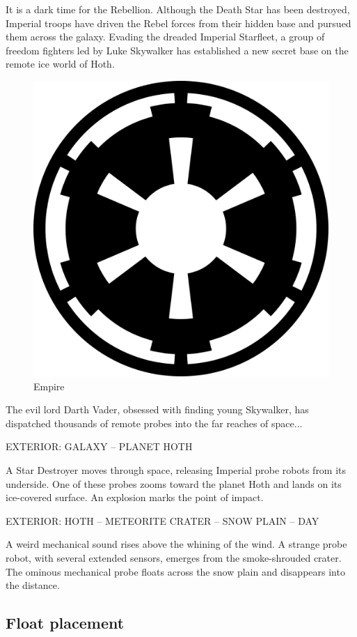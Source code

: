 \documentclass[a4paper]{article}
\begin{document}
It is a dark time for the Rebellion. Although the Death Star has
been destroyed, Imperial troops have driven the Rebel forces from
their hidden base and pursued them across the galaxy.
Evading the dreaded Imperial Starfleet, a group of freedom fighters
led by Luke Skywalker has established a new secret base on the remote
ice world of Hoth.
\begin{figure}
\centering
\includegraphics[width=0.5\linewidth]{empire} 
\caption{Empire}
\label{fig:wrapfig}
\end{figure}
The evil lord Darth Vader, obsessed with finding young Skywalker,
has dispatched thousands of remote probes into the far reaches of
space...

EXTERIOR: GALAXY -- PLANET HOTH

A Star Destroyer moves through space, releasing Imperial probe
robots from its underside. 
One of these probes zooms toward the planet Hoth and lands
on its ice-covered surface. An explosion marks the point of
impact. 

EXTERIOR: HOTH -- METEORITE CRATER -- SNOW PLAIN -- DAY

A weird mechanical sound rises above the whining of the
wind. A strange probe robot, with several extended sensors,
emerges from the smoke-shrouded crater. The ominous mechanical
probe floats across the snow plain and disappears into the
distance.


\subsection{Float placement}
\end{document}
